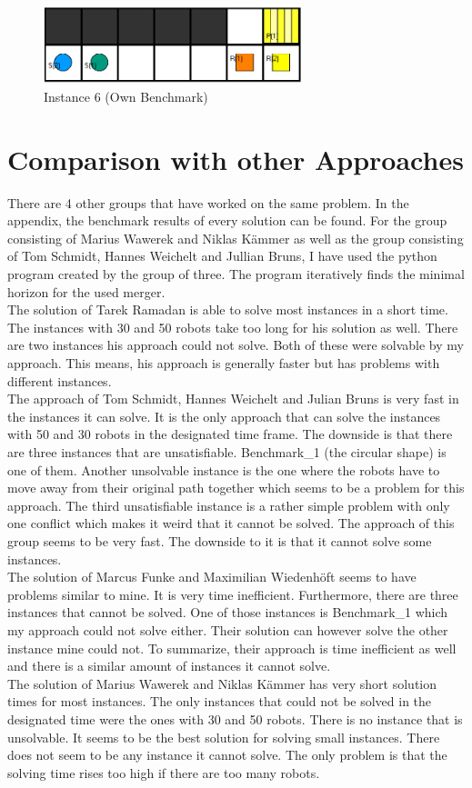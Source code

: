 \documentclass[runningheads]{llncs}
\begin{document}
\begin{figure}[h]
\includegraphics[width=75mm]{Images/Instance 3}
\caption{Instance 6 (Own Benchmark)}
\label{fig:I3}
\end{figure}


\section{Comparison with other Approaches}
There are 4 other groups that have worked on the same problem. In the appendix, the benchmark results of every solution can be found. For the group consisting of Marius Wawerek and Niklas Kämmer as well as the group consisting of Tom Schmidt, Hannes Weichelt and Jullian Bruns, I have used the python program created by the group of three. The program iteratively finds the minimal horizon for the used merger. \\
The solution of Tarek Ramadan \cite{github1} is able to solve most instances in a short time. The instances with 30 and 50 robots take too long for his solution as well. There are two instances his approach could not solve. Both of these were solvable by my approach. This means, his approach is generally faster but has problems with different instances. \\
The approach of Tom Schmidt, Hannes Weichelt and Julian Bruns \cite{github2} is very fast in the instances it can solve. It is the only approach that can solve the instances with 50 and 30 robots in the designated time frame. The downside is that there are three instances that are unsatisfiable. Benchmark\_1 (the circular shape) is one of them. Another unsolvable instance is the one where the robots have to move away from their original path together which seems to be a problem for this approach. The third unsatisfiable instance is a rather simple problem with only one conflict which makes it weird that it cannot be solved. The approach of this group seems to be very fast. The downside to it is that it cannot solve some instances.  \\
The solution of Marcus Funke and Maximilian Wiedenhöft \cite{github3} seems to have problems similar to mine. It is very time inefficient. Furthermore, there are three instances that cannot be solved. One of those instances is Benchmark\_1 which my approach could not solve either. Their solution can however solve the other instance mine could not. To summarize, their approach is time inefficient as well and there is a similar amount of instances it cannot solve. \\
The solution of Marius Wawerek and Niklas Kämmer \cite{github4} has very short solution times for most instances. The only instances that could not be solved in the designated time were the ones with 30 and 50 robots. There is no instance that is unsolvable. It seems to be the best solution for solving small instances. There does not seem to be any instance it cannot solve. The only problem is that the solving time rises too high if there are too many robots.
\end{document}
